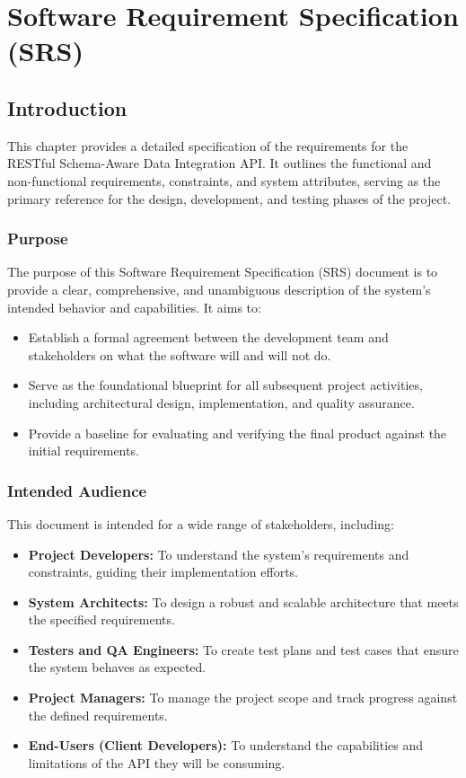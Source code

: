 \documentclass[12pt, a4paper]{report}
\begin{document}
\chapter{Software Requirement Specification (SRS)}

\section{Introduction}
This chapter provides a detailed specification of the requirements for the RESTful Schema-Aware Data Integration API. It outlines the functional and non-functional requirements, constraints, and system attributes, serving as the primary reference for the design, development, and testing phases of the project.

\subsection{Purpose}
The purpose of this Software Requirement Specification (SRS) document is to provide a clear, comprehensive, and unambiguous description of the system's intended behavior and capabilities. It aims to:
\begin{itemize}
    \item Establish a formal agreement between the development team and stakeholders on what the software will and will not do.
    \item Serve as the foundational blueprint for all subsequent project activities, including architectural design, implementation, and quality assurance.
    \item Provide a baseline for evaluating and verifying the final product against the initial requirements.
\end{itemize}

\subsection{Intended Audience}
This document is intended for a wide range of stakeholders, including:
\begin{itemize}
    \item \textbf{Project Developers:} To understand the system's requirements and constraints, guiding their implementation efforts.
    \item \textbf{System Architects:} To design a robust and scalable architecture that meets the specified requirements.
    \item \textbf{Testers and QA Engineers:} To create test plans and test cases that ensure the system behaves as expected.
    \item \textbf{Project Managers:} To manage the project scope and track progress against the defined requirements.
    \item \textbf{End-Users (Client Developers):} To understand the capabilities and limitations of the API they will be consuming.
\end{itemize}
\end{document}
